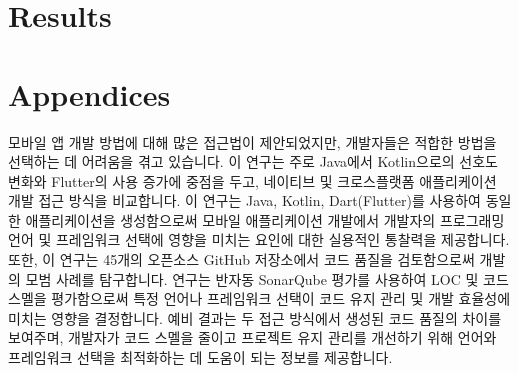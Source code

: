 \documentclass[11pt,jaso]{pnumasterh}
\begin{document}
% 

\section{Results} \label{results}

\nocite{*}


\clearpage

\appendix
\section*{Appendices}

\clearpage

\begin{eabstract}
    모바일 앱 개발 방법에 대해 많은 접근법이 제안되었지만, 개발자들은 적합한 방법을 선택하는 데 어려움을 겪고 있습니다. 이 연구는 주로 Java에서 Kotlin으로의 선호도 변화와 Flutter의 사용 증가에 중점을 두고, 네이티브 및 크로스플랫폼 애플리케이션 개발 접근 방식을 비교합니다. 이 연구는 Java, Kotlin, Dart(Flutter)를 사용하여 동일한 애플리케이션을 생성함으로써 모바일 애플리케이션 개발에서 개발자의 프로그래밍 언어 및 프레임워크 선택에 영향을 미치는 요인에 대한 실용적인 통찰력을 제공합니다. 또한, 이 연구는 45개의 오픈소스 GitHub 저장소에서 코드 품질을 검토함으로써 개발의 모범 사례를 탐구합니다. 연구는 반자동 SonarQube 평가를 사용하여 LOC 및 코드 스멜을 평가함으로써 특정 언어나 프레임워크 선택이 코드 유지 관리 및 개발 효율성에 미치는 영향을 결정합니다. 예비 결과는 두 접근 방식에서 생성된 코드 품질의 차이를 보여주며, 개발자가 코드 스멜을 줄이고 프로젝트 유지 관리를 개선하기 위해 언어와 프레임워크 선택을 최적화하는 데 도움이 되는 정보를 제공합니다.
\end{eabstract}

% 
\end{document}
